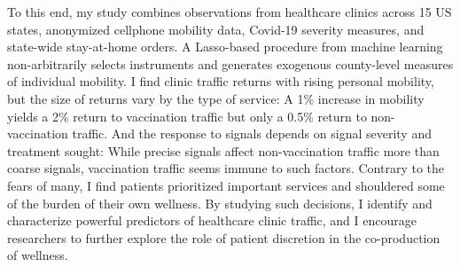 To this end, my study combines observations from healthcare clinics across 15 US states, anonymized cellphone mobility data, Covid-19 severity measures, and state-wide stay-at-home orders. A Lasso-based procedure from machine learning non-arbitrarily selects instruments and generates exogenous county-level measures of individual mobility. I find clinic traffic returns with rising personal mobility, but the size of returns vary by the type of service: A 1\% increase in mobility yields a 2\% return to vaccination traffic but only a 0.5\% return to non-vaccination traffic. And the response to signals depends on signal severity and treatment sought: While precise signals affect non-vaccination traffic more than coarse signals, vaccination traffic seems immune to such factors. Contrary to the fears of many, I find patients prioritized important services and shouldered some of the burden of their own wellness. By studying such decisions, I identify and characterize powerful predictors of healthcare clinic traffic, and I encourage researchers to further explore the role of patient discretion in the co-production of wellness.
